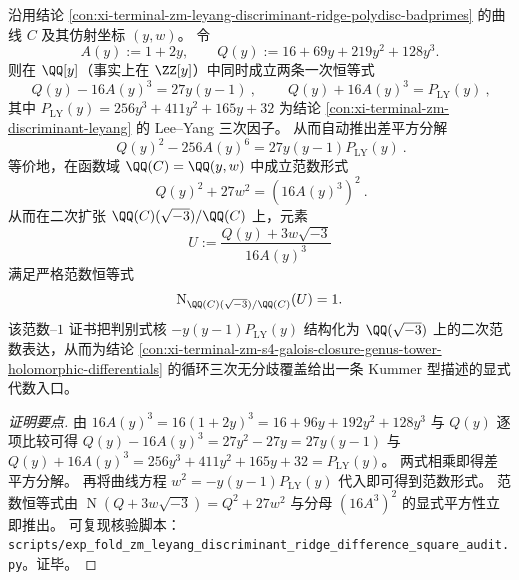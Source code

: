 \begin{conclusion}[判别式二次脊上的差平方范数证书：\texorpdfstring{$Q(y)^2+27w^2=(16A(y)^3)^2$}{Q(y)^2+27w^2=(16A(y)^3)^2}]\label{con:xi-terminal-zm-leyang-discriminant-ridge-diff-square-norm}
沿用结论 \ref{con:xi-terminal-zm-leyang-discriminant-ridge-polydisc-badprimes} 的曲线 \(C\) 及其仿射坐标 \((y,w)\)。
令
\[
A(y):=1+2y,\qquad Q(y):=16+69y+219y^{2}+128y^{3}.
\]
则在 \(\QQ[y]\)（事实上在 \(\ZZ[y]\)）中同时成立两条一次恒等式
\[
\boxed{\ Q(y)-16A(y)^3=27y(y-1)\ },\qquad
\boxed{\ Q(y)+16A(y)^3=P_{\mathrm{LY}}(y)\ },
\]
其中 \(P_{\mathrm{LY}}(y)=256y^3+411y^2+165y+32\) 为结论 \ref{con:xi-terminal-zm-discriminant-leyang} 的 Lee--Yang 三次因子。
从而自动推出差平方分解
\[
\boxed{\ Q(y)^2-256A(y)^6=27y(y-1)P_{\mathrm{LY}}(y)\ }.
\]
等价地，在函数域 \(\QQ(C)=\QQ(y,w)\) 中成立范数形式
\[
\boxed{\ Q(y)^2+27w^2=(16A(y)^3)^2\ }.
\]
从而在二次扩张 \(\QQ(C)(\sqrt{-3})/\QQ(C)\) 上，元素
\[
U:=\frac{Q(y)+3w\sqrt{-3}}{16A(y)^3}
\]
满足严格范数恒等式
\[
\operatorname{N}_{\QQ(C)(\sqrt{-3})/\QQ(C)}(U)=1.
\]
该范数--\(1\) 证书把判别式核 \(-y(y-1)P_{\mathrm{LY}}(y)\) 结构化为 \(\QQ(\sqrt{-3})\) 上的二次范数表达，从而为结论 \ref{con:xi-terminal-zm-s4-galois-closure-genus-tower-holomorphic-differentials} 的循环三次无分歧覆盖给出一条 Kummer 型描述的显式代数入口。
\end{conclusion}
\begin{proof}[证明要点]
由
\(
16A(y)^3=16(1+2y)^3=16+96y+192y^2+128y^3
\)
与 \(Q(y)\) 逐项比较可得
\(
Q(y)-16A(y)^3=27y^2-27y=27y(y-1)
\)
与
\(
Q(y)+16A(y)^3=256y^3+411y^2+165y+32=P_{\mathrm{LY}}(y)
\)。
两式相乘即得差平方分解。
再将曲线方程 \(w^2=-y(y-1)P_{\mathrm{LY}}(y)\) 代入即可得到范数形式。
范数恒等式由
\(
\operatorname{N}(Q+3w\sqrt{-3})=Q^2+27w^2
\)
与分母 \((16A^3)^2\) 的显式平方性立即推出。
可复现核验脚本：\texttt{scripts/exp\_fold\_zm\_leyang\_discriminant\_ridge\_difference\_square\_audit.py}。证毕。
\end{proof}




